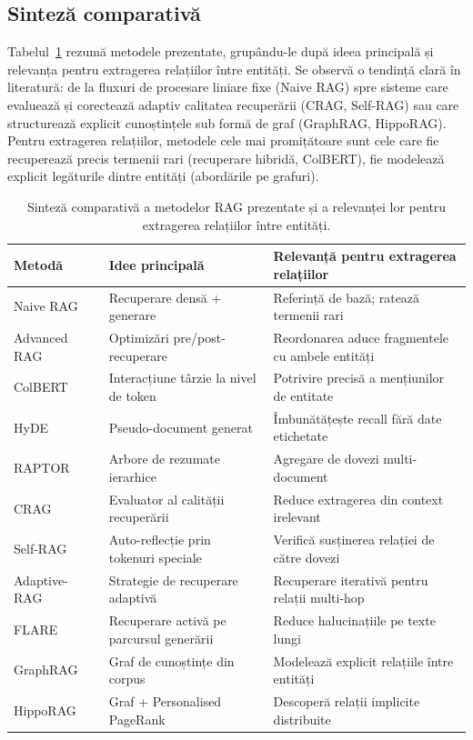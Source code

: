 \subsection{Sinteză comparativă}

Tabelul~\ref{tab:metode} rezumă metodele prezentate, grupându-le după ideea principală și relevanța pentru extragerea relațiilor între entități. Se observă o tendință clară în literatură: de la fluxuri de procesare liniare fixe (Naive RAG) spre sisteme care evaluează și corectează adaptiv calitatea recuperării (CRAG, Self-RAG) sau care structurează explicit cunoștințele sub formă de graf (GraphRAG, HippoRAG). Pentru extragerea relațiilor, metodele cele mai promițătoare sunt cele care fie recuperează precis termenii rari (recuperare hibridă, ColBERT), fie modelează explicit legăturile dintre entități (abordările pe grafuri).

\begin{table}[htbp]
\centering
\small
\begin{tabularx}{\textwidth}{l l X}
\toprule
\textbf{Metodă} & \textbf{Idee principală} & \textbf{Relevanță pentru extragerea relațiilor} \\
\midrule
Naive RAG~\cite{lewis2020rag} & Recuperare densă + generare & Referință de bază; ratează termenii rari \\
Advanced RAG~\cite{gao2024retrievalaugmentedgenerationlargelanguage} & Optimizări pre/post-recuperare & Reordonarea aduce fragmentele cu ambele entități \\
ColBERT~\cite{khattab2020colbert} & Interacțiune târzie la nivel de token & Potrivire precisă a mențiunilor de entitate \\
HyDE~\cite{gao2023hyde} & Pseudo-document generat & Îmbunătățește recall fără date etichetate \\
RAPTOR~\cite{sarthi2024raptor} & Arbore de rezumate ierarhice & Agregare de dovezi multi-document \\
CRAG~\cite{yan2024crag} & Evaluator al calității recuperării & Reduce extragerea din context irelevant \\
Self-RAG~\cite{asai2023self} & Auto-reflecție prin tokenuri speciale & Verifică susținerea relației de către dovezi \\
Adaptive-RAG~\cite{jeong2024adaptiverag} & Strategie de recuperare adaptivă & Recuperare iterativă pentru relații multi-hop \\
FLARE~\cite{jiang2023flare} & Recuperare activă pe parcursul generării & Reduce halucinațiile pe texte lungi \\
GraphRAG~\cite{edge2024graphrag} & Graf de cunoștințe din corpus & Modelează explicit relațiile între entități \\
HippoRAG~\cite{gutierrez2024hipporag} & Graf + Personalised PageRank & Descoperă relații implicite distribuite \\
\bottomrule
\end{tabularx}
\caption{Sinteză comparativă a metodelor RAG prezentate și a relevanței lor pentru extragerea relațiilor între entități.}
\label{tab:metode}
\end{table}

